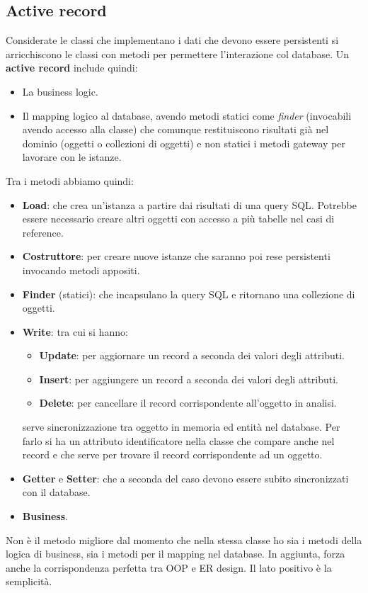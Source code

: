 \subsection{Active record}
Considerate le classi che implementano i dati che devono essere persistenti si
arricchiscono le classi con metodi per permettere l'interazione col database. Un
\textbf{active record} include quindi:
\begin{itemize}
      \item La business logic.
      \item Il mapping logico al database, avendo  metodi statici come
            \textit{finder} (invocabili avendo accesso alla classe) che comunque
            restituiscono risultati già nel dominio (oggetti o collezioni di
            oggetti) e non statici i metodi gateway per lavorare con le istanze.
\end{itemize}
Tra i metodi abbiamo quindi:
\begin{itemize}
      \item \textbf{Load}: che crea un'istanza a partire dai risultati di una
            query SQL. Potrebbe essere necessario creare altri oggetti con
            accesso a più tabelle nel casi di reference.
      \item \textbf{Costruttore}: per creare nuove istanze che saranno poi rese
            persistenti invocando metodi appositi.
      \item \textbf{Finder} (statici): che incapsulano la query SQL e ritornano
            una collezione di oggetti.
      \item \textbf{Write}: tra cui si hanno:
            \begin{itemize}
                  \item \textbf{Update}: per aggiornare un record a seconda dei
                        valori degli attributi.
                  \item \textbf{Insert}: per aggiungere un record a seconda dei
                        valori degli attributi.
                  \item \textbf{Delete}: per cancellare il record corrispondente
                        all'oggetto in analisi.
            \end{itemize}
            serve sincronizzazione tra oggetto in memoria ed entità nel database.
            Per farlo si ha un attributo identificatore nella classe che compare
            anche nel record e che serve per trovare il record corrispondente ad
            un oggetto.
      \item \textbf{Getter} e \textbf{Setter}: che a seconda del caso devono
            essere subito sincronizzati con il database.
      \item \textbf{Business}.
\end{itemize}
Non è il metodo migliore dal momento che nella stessa classe ho sia i metodi
della logica di business, sia i metodi per il mapping nel database. In aggiunta,
forza anche la corrispondenza perfetta tra OOP e ER design. Il lato positivo è
la semplicità.
